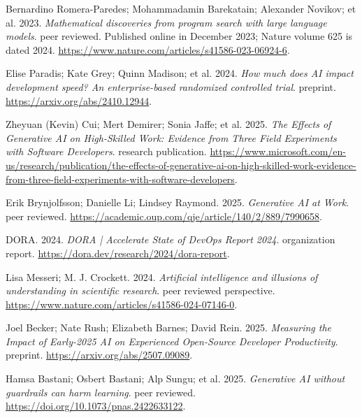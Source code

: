 {\begin{description}[leftmargin=2em,labelwidth=1.5em,itemsep=1pt,parsep=0pt]
\item[15.] \hypertarget{ref-funsearch2023}{} Bernardino Romera-Paredes; Mohammadamin Barekatain; Alexander Novikov; et al. 2023. \textit{Mathematical discoveries from program search with large language models}. peer reviewed. Published online in December 2023; Nature volume 625 is dated 2024. \url{https://www.nature.com/articles/s41586-023-06924-6}.

\item[16.] \hypertarget{ref-paradis2024}{} Elise Paradis; Kate Grey; Quinn Madison; et al. 2024. \textit{How much does AI impact development speed? An enterprise-based randomized controlled trial}. preprint. \url{https://arxiv.org/abs/2410.12944}.

\item[17.] \hypertarget{ref-cui2025}{} Zheyuan (Kevin) Cui; Mert Demirer; Sonia Jaffe; et al. 2025. \textit{The Effects of Generative AI on High-Skilled Work: Evidence from Three Field Experiments with Software Developers}. research publication. \url{https://www.microsoft.com/en-us/research/publication/the-effects-of-generative-ai-on-high-skilled-work-evidence-from-three-field-experiments-with-software-developers}.

\item[18.] \hypertarget{ref-brynjolfsson2025}{} Erik Brynjolfsson; Danielle Li; Lindsey Raymond. 2025. \textit{Generative AI at Work}. peer reviewed. \url{https://academic.oup.com/qje/article/140/2/889/7990658}.

\item[19.] \hypertarget{ref-dora2024}{} DORA. 2024. \textit{DORA | Accelerate State of DevOps Report 2024}. organization report. \url{https://dora.dev/research/2024/dora-report}.

\item[20.] \hypertarget{ref-messeri2024}{} Lisa Messeri; M. J. Crockett. 2024. \textit{Artificial intelligence and illusions of understanding in scientific research}. peer reviewed perspective. \url{https://www.nature.com/articles/s41586-024-07146-0}.

\item[21.] \hypertarget{ref-metr2025}{} Joel Becker; Nate Rush; Elizabeth Barnes; David Rein. 2025. \textit{Measuring the Impact of Early-2025 AI on Experienced Open-Source Developer Productivity}. preprint. \url{https://arxiv.org/abs/2507.09089}.

\item[22.] \hypertarget{ref-bastani2025}{} Hamsa Bastani; Osbert Bastani; Alp Sungu; et al. 2025. \textit{Generative AI without guardrails can harm learning}. peer reviewed. \url{https://doi.org/10.1073/pnas.2422633122}.


\end{description}}

